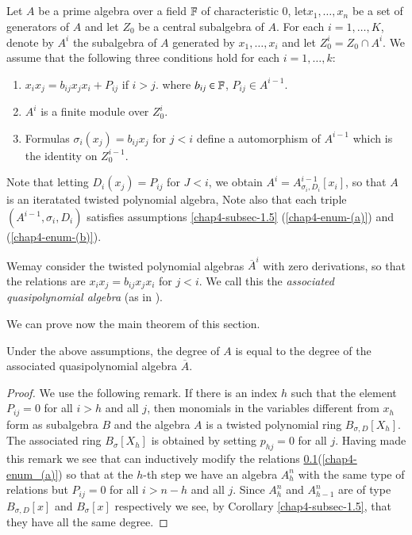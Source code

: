 \subsection{}\label{chap4-subsec-1.6}
Let $A$ be a prime algebra over a field $\mathbb{F}$ of characteristic 0, let\break $x_{1}, \ldots, x_{n}$ be a set of generators of $A$ and let $Z_{0}$ be a central subalgebra of $A$. For each $i =1, \ldots, K$, denote by $A^{i}$ the subalgebra of $A$ generated by $x_{1}, \ldots, x_{i}$ and let $Z_{0}^{i} = Z_{0}\cap A^{i}$. We assume that the following three conditions hold for each $i=1,\ldots, k$:
\begin{enumerate}[{\rm (a)}]
\item $x_{i}x_{j} = b_{ij}x_{j}x_{i} + P_{ij}$ if $i>j$. where $b_{ij}\in \mathbb{F}$, $P_{ij} \in A^{i-1}$.\label{chap4-enum_(a)}
\item $A^{i}$ is a finite module over $Z_{0}^{i}$.\label{chap4-enum_(b)}
\item Formulas $\sigma_{i}(x_{j}) = b_{ij}x_{j}$ for $j< i$  define a automorphism of $A^{i-1}$ which is the identity on $Z_{0}^{i-1}$.\label{chap4-enum_(c)}
\end{enumerate}

Note that letting $D_{i}(x_{j}) = P_{ij}$ for $J < i$, we obtain $A^{i} = A_{\sigma_{i}, D_{i}}^{i-1}[x_{i}]$, so that $A$ is an iteratated twisted polynomial algebra, Note also that each triple $(A^{i-1}, \sigma_{i}, D_{i})$ satisfies assumptions \ref{chap4-subsec-1.5} (\ref{chap4-enum-(a)}) and (\ref{chap4-enum-(b)}). 

We\pageoriginale may consider the twisted polynomial algebras $\overline{A}^{i}$ with zero derivations, so that the relations are $x_{i}x_{j} = b_{ij}x_{j}x_{i}$ for $j < i$. We call this the \textit{associated quasipolynomial algebra} (as in \cite{chap4-keyDK1}).

We can prove now the main theorem of this section.

\begin{theorem*}
Under the above assumptions, the degree of $A$ is equal to the degree of the associated quasipolynomial algebra $\overline{A}$. 
\end{theorem*}

\begin{proof}
We use the following remark. If there is an index $h$ such that the element $P_{ij} =0$ for all $i> h$ and all $j$, then monomials in the variables different from $x_{h}$ form as subalgebra $B$ and the algebra $A$ is a twisted polynomial ring $B_{\sigma, D}[X_{h}]$. The associated ring $B_{\sigma}[X_{h}]$ is obtained by setting $p_{hj} = 0$ for all $j$. Having made this remark we see that can inductively modify the relations \ref{chap4-subsec-1.6}(\ref{chap4-enum_(a)}) so that at the $h$-th step we have an algebra $A_{h}^{n}$ with the same type of relations but $P_{ij} = 0$ for all $i>n-h$ and all $j$. Since $A_{h}^{n}$ and $A_{h-1}^{n}$ are of type $B_{\sigma, D}[x]$ and $B_{\sigma}[x]$ respectively we see, by Corollary \ref{chap4-subsec-1.5}, that they have all the same degree. 
\end{proof}


